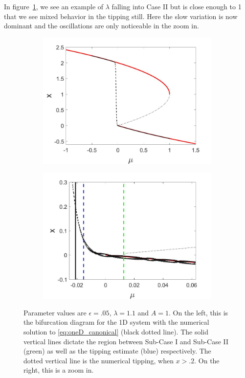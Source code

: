 In figure~\ref{fig:oneD_slowosc_numerical_medium}, we see an example of $\lambda$ falling into Case II but is close enough to 1 that we see mixed behavior in the tipping still. Here the slow variation is now dominant and the oscillations are only noticeable in the zoom in. 

\begin{figure}[H]
\centering
\begin{subfigure}{.5\textwidth}
  \centering
  \includegraphics[width=\linewidth]{oneD/slowosc_bif_diagram_medium.jpg}
  \caption{}
\end{subfigure}%
\begin{subfigure}{.5\textwidth}
  \centering
  \includegraphics[width=\linewidth]{oneD/slowosc_bif_diagram_medium_zoom.jpg}
  \caption{}
\end{subfigure}
\caption{Parameter values are $\epsilon=.05$, $\lambda=1.1$ and $A=1$. On the left, this is the bifurcation diagram for the 1D system with the numerical solution to \eqref{eq:oneD_canonical} (black dotted line). The solid vertical lines dictate the region between Sub-Case I and Sub-Case II (green) as well as the tipping estimate (blue) respectively. The dotted vertical line is the numerical tipping, when $x>.2$. On the right, this is a zoom in.}
\label{fig:oneD_slowosc_numerical_medium}
\end{figure}

